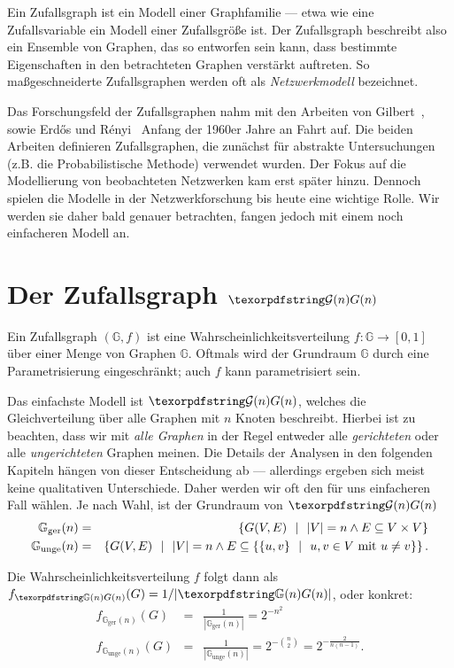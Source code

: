 Ein Zufallsgraph ist ein Modell einer Graphfamilie --- etwa wie eine Zufallsvariable ein Modell einer Zufallsgröße ist.
Der Zufallsgraph beschreibt also ein Ensemble von Graphen, das so entworfen sein kann, dass bestimmte Eigenschaften in den betrachteten Graphen verstärkt auftreten.
So maßgeschneiderte Zufallsgraphen werden oft als \emph{Netzwerkmodell} bezeichnet.

Das Forschungsfeld der Zufallsgraphen nahm mit den Arbeiten von Gilbert~\cite{gilbert_1959}, sowie Erd\H{o}s und R\'enyi~\cite{erdos_renyi_1960} Anfang der 1960er Jahre an Fahrt auf.
Die beiden Arbeiten definieren Zufallsgraphen, die zunächst für abstrakte Untersuchungen (z.B. die Probabilistische Methode) verwendet wurden.
Der Fokus auf die Modellierung von beobachteten Netzwerken kam erst später hinzu.
Dennoch spielen die Modelle in der Netzwerkforschung bis heute eine wichtige Rolle.
Wir werden sie daher bald genauer betrachten, fangen jedoch mit einem noch einfacheren Modell an.

\section{Der Zufallsgraph $\Gn$}
Ein Zufallsgraph $(\mathbb G, f)$ ist eine Wahrscheinlichkeitsverteilung $f\colon \mathbb G \to [0, 1]$ über einer Menge von Graphen $\mathbb G$.
Oftmals wird der Grundraum $\mathbb G$ durch eine Parametrisierung eingeschränkt; auch $f$ kann parametrisiert sein.

Das  einfachste Modell ist $\Gn$, welches die Gleichverteilung über alle Graphen mit $n$ Knoten beschreibt.
Hierbei ist zu beachten, dass wir mit \emph{alle Graphen} in der Regel entweder alle \emph{gerichteten} oder alle \emph{ungerichteten} Graphen meinen.
Die Details der Analysen in den folgenden Kapiteln hängen von dieser Entscheidung ab --- allerdings ergeben sich meist keine qualitativen Unterschiede.
Daher werden wir oft den für uns einfacheren Fall wählen.
Je nach Wahl, ist der Grundraum von $\Gn$
\begin{eqnarray}
    \mathbb G_\text{ger}(n) &=&
    \left\{ G(V,E) \ \ \middle|\ \ |V| = n \land E \subseteq V \times V \right\}\\
    \mathbb G_\text{unge}(n) &=&
    \left\{ G(V,E) \ \ \middle|\ \ |V| = n \land  E \subseteq \left\{ \left\{u,v\right\} \ \ \middle|\ \ u,v \in V \text{ mit } u \ne v \right\} \right\}.
\end{eqnarray}

\noindent Die Wahrscheinlichkeitsverteilung $f$ folgt dann als $f_{\gGn}(G) = 1 / | \gGn |$, oder konkret:
\begin{eqnarray}
    f_{\mathbb G_\text{ger}(n)}(G) &=& \frac{1}{| \mathbb G_\text{ger}(n) |} = 2^{-n^2}\\
    f_{\mathbb G_\text{unge}(n)}(G) &=& \frac{1}{| \mathbb G_\text{unge}(n) |} = 2^{-\binom n 2} = 2^{-\frac{2}{n(n-1)}}.
\end{eqnarray}

